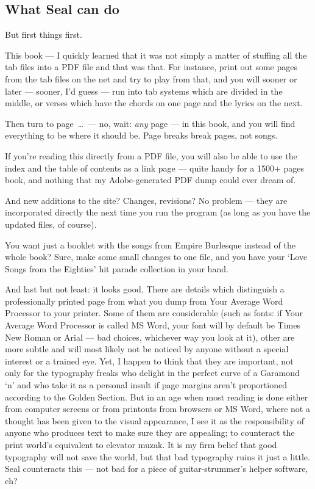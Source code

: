 \begin{articlelayout}
\subsection*{What Seal can do}

But first things first.
 
This book --- I quickly learned that it was not simply a matter of
stuffing all the tab files into a PDF file and that was that. For
instance, print out some pages from the tab files on the net and try
to play from that, and you will sooner or later --- sooner, I'd guess
--- run into tab systems which are divided in the middle, or verses
which have the chords on one page and the lyrics on the next.
 
Then turn to page~\ldots{}~--- no, wait: \emph{any }page --- in this
book, and you will find everything to be where it should be. Page
breaks break pages, not songs.
 
If you're reading this directly from a PDF file, you will also be able
to use the index and the table of contents as a link page --- quite
handy for a 1500+ pages book, and nothing that my Adobe-generated PDF
dump could ever dream of.
 
And new additions to the site? Changes, revisions? No problem --- they
are incorporated directly the next time you run the program (as long
as you have the updated files, of course).
 
You want just a booklet with the songs from Empire Burlesque instead
of the whole book? Sure, make some small changes to one file, and you
have your `Love Songs from the Eighties' hit parade collection
in your hand.
 
And last but not least: it looks good. There are details which
distinguish a professionally printed page from what you dump from Your
Average Word Processor to your printer. Some of them are considerable
(such as fonts: if Your Average Word Processor is called MS Word, your
font will by default be Times New Roman or Arial --- bad choices,
whichever way you look at it), other are more subtle and will most
likely not be noticed by anyone without a special interest or a
trained eye. Yet, I happen to think that they are important, not only
for the typography freaks who delight in the perfect curve of a
Garamond `n' and who take it as a personal insult if page
margins aren't proportioned according to the Golden Section. But in an
age when most reading is done either from computer screens or from
printouts from browsers or \textsc{MS} Word, where not a thought has been given
to the visual appearance, I see it as the responsibility of anyone who
produces text to make sure they are appealing; to counteract the print
world's equivalent to elevator muzak. It is my firm belief that good
typography will not save the world, but that bad typography ruins it
just a little. Seal counteracts this --- not bad for a piece of
guitar-strummer's helper software, eh?
 

\end{articlelayout}
